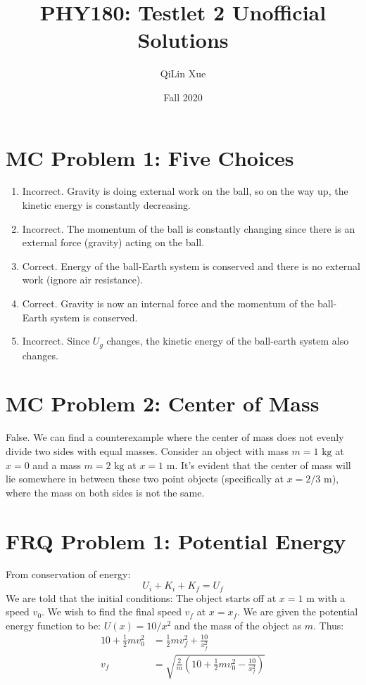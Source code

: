 \documentclass{article}
\title{PHY180: Testlet 2 Unofficial Solutions}
\author{QiLin Xue}
\date{Fall 2020}
\begin{document}
\maketitle
\section*{MC Problem 1: Five Choices}
\begin{enumerate}
    \item Incorrect. Gravity is doing external work on the ball, so on the way up, the kinetic energy is constantly decreasing.
    \item Incorrect. The momentum of the ball is constantly changing since there is an external force (gravity) acting on the ball.
    \item Correct. Energy of the ball-Earth system is conserved and there is no external work (ignore air resistance).
    \item Correct. Gravity is now an internal force and the momentum of the ball-Earth system is conserved.
    \item Incorrect. Since $U_g$ changes, the kinetic energy of the ball-earth system also changes.
\end{enumerate}
\section*{MC Problem 2: Center of Mass}
False. We can find a counterexample where the center of mass does not evenly divide two sides with equal masses. Consider an object with mass $m=1\text{ kg}$ at $x=0$ and a mass $m=2\text{ kg}$ at $x=1 \text{ m}$. It's evident that the center of mass will lie somewhere in between these two point objects (specifically at $x=2/3\text{ m}$), where the mass on both sides is not the same.

\section*{FRQ Problem 1: Potential Energy}
From conservation of energy:
\begin{equation}
    U_i+K_i+K_f=U_f
    \label{eq:}
\end{equation}
We are told that the initial conditions: The object starts off at $x=1\text{ m}$ with a speed $v_0$. We wish to find the final speed $v_f$ at $x=x_f$. We are given the potential energy function to be: $U(x)=10/x^2$ and the mass of the object as $m$. Thus:
\begin{align*}
    10+\frac{1}{2}mv_0^2&=\frac{1}{2}mv_f^2+\frac{10}{x_f^2} \\
    v_f &= \sqrt{\frac{2}{m}\left(10+\frac{1}{2}mv_0^2-\frac{10}{x_f^2}\right)}
\end{align*}
\end{document}
